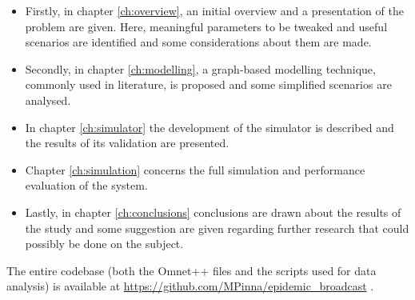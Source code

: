 \begin{itemize}
    \item Firstly, in chapter \ref{ch:overview}, an initial overview and a presentation of the problem are
    given. Here, meaningful parameters to be tweaked and useful scenarios are
    identified and some considerations about them are made.
    \item Secondly, in chapter \ref{ch:modelling}, a graph-based modelling technique, commonly used in
    literature, is proposed and some simplified scenarios are analysed.
    \item In chapter \ref{ch:simulator} the development of the simulator is
    described and the results of its validation are presented.
    \item Chapter \ref{ch:simulation} concerns the full simulation and performance
    evaluation of the system.
	\item Lastly, in chapter \ref{ch:conclusions} conclusions are drawn about the results of the study and some suggestion are given regarding further research that could possibly be done on the subject.
\end{itemize}

\noindent
The entire codebase (both the  Omnet++ files and the scripts used for data analysis) is available at \url{https://github.com/MPinna/epidemic_broadcast} .